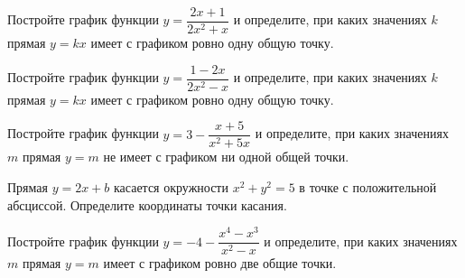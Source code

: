 \begin{class}[number=3]
	\begin{listofex}
		\item Постройте график функции \( y=\dfrac{2x+1}{2x^2+x} \) и определите, при каких значениях \( k \) прямая \( y=kx \) имеет с графиком ровно одну общую точку.
		\item Постройте график функции \( y=\dfrac{1-2x}{2x^2-x} \) и определите, при каких значениях \( k \) прямая \( y=kx \) имеет с графиком ровно одну общую точку.
		\item Постройте график функции \( y=3-\dfrac{x+5}{x^2+5x} \) и определите, при каких значениях \( m \) прямая \( y=m \) не имеет с графиком ни одной общей точки.
		\item Прямая \( y=2x+b \) касается окружности \( x^2+y^2=5 \) в точке с положительной абсциссой. Определите координаты точки касания.
		\item Постройте график функции \( y=-4-\dfrac{x^4-x^3}{x^2-x} \) и определите, при каких значениях \( m \) прямая \( y=m \) имеет с графиком ровно две общие точки.
	\end{listofex}
\end{class}

